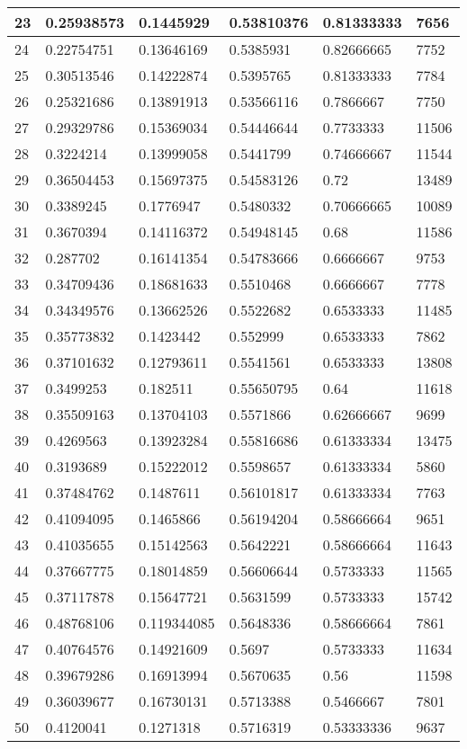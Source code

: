 \begin{longtable}{|l|l|l|l|l|l|}
23 & 0.25938573 & 0.1445929 & 0.53810376 & 0.81333333 & 7656 \\ \hline 
24 & 0.22754751 & 0.13646169 & 0.5385931 & 0.82666665 & 7752 \\ \hline 
25 & 0.30513546 & 0.14222874 & 0.5395765 & 0.81333333 & 7784 \\ \hline 
26 & 0.25321686 & 0.13891913 & 0.53566116 & 0.7866667 & 7750 \\ \hline 
27 & 0.29329786 & 0.15369034 & 0.54446644 & 0.7733333 & 11506 \\ \hline 
28 & 0.3224214 & 0.13999058 & 0.5441799 & 0.74666667 & 11544 \\ \hline 
29 & 0.36504453 & 0.15697375 & 0.54583126 & 0.72 & 13489 \\ \hline 
30 & 0.3389245 & 0.1776947 & 0.5480332 & 0.70666665 & 10089 \\ \hline 
31 & 0.3670394 & 0.14116372 & 0.54948145 & 0.68 & 11586 \\ \hline 
32 & 0.287702 & 0.16141354 & 0.54783666 & 0.6666667 & 9753 \\ \hline 
33 & 0.34709436 & 0.18681633 & 0.5510468 & 0.6666667 & 7778 \\ \hline 
34 & 0.34349576 & 0.13662526 & 0.5522682 & 0.6533333 & 11485 \\ \hline 
35 & 0.35773832 & 0.1423442 & 0.552999 & 0.6533333 & 7862 \\ \hline 
36 & 0.37101632 & 0.12793611 & 0.5541561 & 0.6533333 & 13808 \\ \hline 
37 & 0.3499253 & 0.182511 & 0.55650795 & 0.64 & 11618 \\ \hline 
38 & 0.35509163 & 0.13704103 & 0.5571866 & 0.62666667 & 9699 \\ \hline 
39 & 0.4269563 & 0.13923284 & 0.55816686 & 0.61333334 & 13475 \\ \hline 
40 & 0.3193689 & 0.15222012 & 0.5598657 & 0.61333334 & 5860 \\ \hline 
41 & 0.37484762 & 0.1487611 & 0.56101817 & 0.61333334 & 7763 \\ \hline 
42 & 0.41094095 & 0.1465866 & 0.56194204 & 0.58666664 & 9651 \\ \hline 
43 & 0.41035655 & 0.15142563 & 0.5642221 & 0.58666664 & 11643 \\ \hline 
44 & 0.37667775 & 0.18014859 & 0.56606644 & 0.5733333 & 11565 \\ \hline 
45 & 0.37117878 & 0.15647721 & 0.5631599 & 0.5733333 & 15742 \\ \hline 
46 & 0.48768106 & 0.119344085 & 0.5648336 & 0.58666664 & 7861 \\ \hline 
47 & 0.40764576 & 0.14921609 & 0.5697 & 0.5733333 & 11634 \\ \hline 
48 & 0.39679286 & 0.16913994 & 0.5670635 & 0.56 & 11598 \\ \hline 
49 & 0.36039677 & 0.16730131 & 0.5713388 & 0.5466667 & 7801 \\ \hline 
50 & 0.4120041 & 0.1271318 & 0.5716319 & 0.53333336 & 9637 \\ \hline 
\end{longtable}